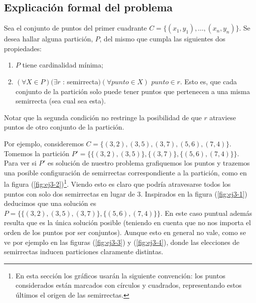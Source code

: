 \subsection{Explicación formal del problema}
\label{subsec:problema3}
Sea el conjunto de puntos del primer cuadrante $C = \{(x_1, y_1), \hdots, (x_n, y_n)\}$. Se desea hallar alguna partición, $P$, del mismo que cumpla las siguientes dos propiedades:
\begin{enumerate}
  \item $P$ tiene cardinalidad mínima;
  \item $(\forall X \in P) (\exists r$ : semirrecta$) (\forall punto \in X)$ $punto \in r$. Esto es, que cada conjunto de la partición solo puede tener puntos que pertenecen a una misma semirrecta (sea cual sea esta). 
\end{enumerate}
Notar que la segunda condición no restringe la posibilidad de que $r$ atraviese puntos de otro conjunto de la partición. 

Por ejemplo, consideremos $C=\{(3,2), (3,5), (3,7), (5,6), (7,4)\}$. Tomemos la partición $P' = \{\{(3,2), (3,5)\}, \{(3,7)\},\{(5,6), (7,4)\}\}$. Para ver si $P'$ es solución de nuestro problema grafiquemos los puntos y trazemos una posible configuración de semirrectas correspondiente a la partición, como en la figura (\ref{fig:ej3-2})\footnote{En esta sección los gráficos usarán la siguiente convención: los puntos considerados están marcados con círculos y cuadrados, representando estos últimos el origen de las semirrectas. }. Viendo esto es claro que podría atravesarse todos los puntos con solo dos semirrectas en lugar de 3. Inspirados en la figura (\ref{fig:ej3-1}) deducimos que una solución es $P = \{\{(3,2), (3,5), (3,7)\},\{(5,6), (7,4)\}\}$. En este caso puntual además resulta que es la única solución posible (teniendo en cuenta que no nos importa el orden de los puntos por ser conjuntos). Aunque esto en general no vale, como se ve por ejemplo en las figuras (\ref{fig:ej3-3}) y (\ref{fig:ej3-4}), donde las elecciones de semirrectas inducen particiones claramente distintas.

